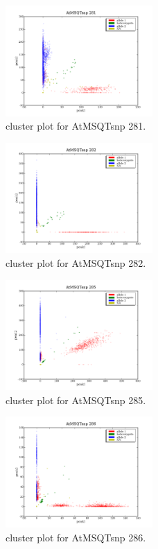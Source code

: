 \begin{figure}[H]
\includegraphics[width=0.5\textwidth]{figures/cluster_plot_AtMSQTsnp_281.png}
\caption{cluster plot for AtMSQTsnp 281.} \label{flAtMSQTsnp281}
\end{figure}

\begin{figure}[H]
\includegraphics[width=0.5\textwidth]{figures/cluster_plot_AtMSQTsnp_282.png}
\caption{cluster plot for AtMSQTsnp 282.} \label{flAtMSQTsnp282}
\end{figure}

\begin{figure}[H]
\includegraphics[width=0.5\textwidth]{figures/cluster_plot_AtMSQTsnp_285.png}
\caption{cluster plot for AtMSQTsnp 285.} \label{flAtMSQTsnp285}
\end{figure}

\begin{figure}[H]
\includegraphics[width=0.5\textwidth]{figures/cluster_plot_AtMSQTsnp_286.png}
\caption{cluster plot for AtMSQTsnp 286.} \label{flAtMSQTsnp286}
\end{figure}

